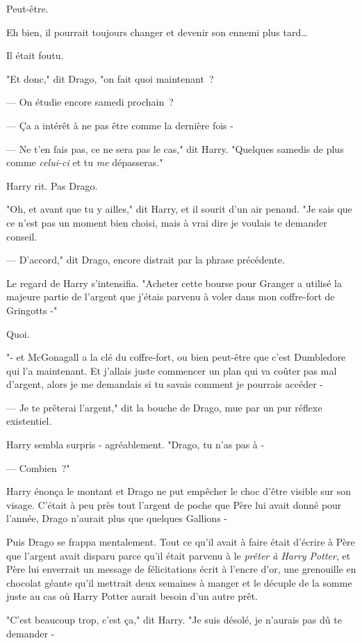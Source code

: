 Peut-être.

Eh bien, il pourrait toujours changer et devenir son ennemi plus tard…

Il était foutu.

"Et donc," dit Drago, "on fait quoi maintenant~?

--- On étudie encore samedi prochain~?

--- Ça a intérêt à ne pas être comme la dernière fois -

--- Ne t'en fais pas, ce ne sera pas le cas," dit Harry. "Quelques samedis de plus comme \emph{celui-ci} et tu \emph{me} dépasseras."

Harry rit. Pas Drago.

"Oh, et avant que tu y ailles," dit Harry, et il sourit d'un air penaud. "Je sais que ce n'est pas un moment bien choisi, mais à vrai dire je voulais te demander conseil.

--- D'accord," dit Drago, encore distrait par la phrase précédente.

Le regard de Harry s'intensifia. "Acheter cette bourse pour Granger a utilisé la majeure partie de l'argent que j'étais parvenu à voler dans mon coffre-fort de Gringotts -"

Quoi.

"- et McGonagall a la clé du coffre-fort, ou bien peut-être que c'est Dumbledore qui l'a maintenant. Et j'allais juste commencer un plan qui va coûter pas mal d'argent, alors je me demandais si tu savais comment je pourrais accéder -

--- Je te prêterai l'argent," dit la bouche de Drago, mue par un pur réflexe existentiel.

Harry sembla surpris - agréablement. "Drago, tu n'as pas à -

--- Combien~?"

Harry énonça le montant et Drago ne put empêcher le choc d'être visible sur son visage. C'était à peu près tout l'argent de poche que Père lui avait donné pour l'année, Drago n'aurait plus que quelques Gallions -

Puis Drago se frappa mentalement. Tout ce qu'il avait à faire était d'écrire à Père que l'argent avait disparu parce qu'il était parvenu à le \emph{prêter à Harry Potter}, et Père lui enverrait un message de félicitations écrit à l'encre d'or, une grenouille en chocolat géante qu'il mettrait deux semaines à manger et le décuple de la somme juste au cas où Harry Potter aurait besoin d'un autre prêt.

"C'est beaucoup trop, c'est ça," dit Harry. "Je suis désolé, je n'aurais pas dû te demander -

